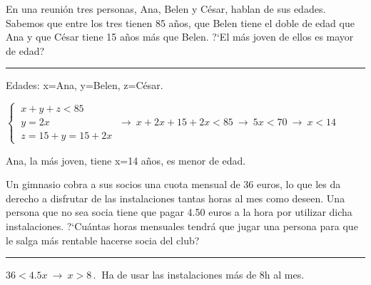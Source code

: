 \begin{miejercicio}

En una reunión tres personas, Ana, Belen y César, hablan de sus edades. Sabemos que entre los tres tienen 85 años, que Belen tiene el doble de edad que Ana y que César tiene 15 años más que Belen. ?`El más joven de ellos es mayor de edad?

\rule{250pt}{0.1pt}

\vspace{4mm} Edades: x=Ana, y=Belen, z=César. 

\vspace{2mm}$\begin{cases}\ x+y+z<85 \\ \ y=2x\\ \ z=15+y=15+2x \end{cases} \ \to \ x+2x+15+2x<85 \ \to \ 5x<70 \ \to \ x<14$

\vspace{2mm} Ana, la más joven, tiene x=14 años, es menor de edad.
	
\end{miejercicio}

\begin{miejercicio}

Un gimnasio cobra a sus socios una cuota mensual de 36 euros, lo que les da derecho a disfrutar de las instalaciones tantas horas al mes como deseen. Una persona que no sea socia tiene que pagar 4.50 euros a la hora por utilizar dicha instalaciones. ?`Cuántas horas mensuales tendrá que jugar una persona para que le salga más rentable hacerse socia del club?

\rule{250pt}{0.1pt}

\vspace{4mm} $36<4.5 x \ \to \ x>8\, . \ $ Ha de usar las instalaciones más de 8h al mes.

\end{miejercicio}

